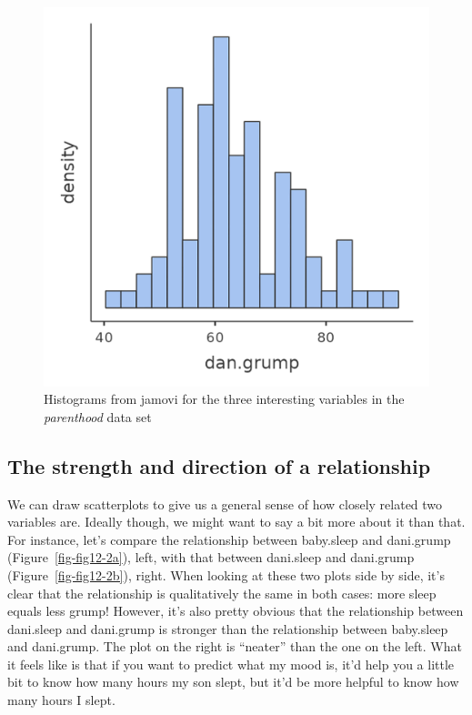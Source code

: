 \documentclass[
  a4paper,
]{book}
\begin{document}
\begin{figure}
\begin{minipage}[b]{0.33\linewidth}
{}

\subcaption{\label{fig-fig12-1b}}
\end{minipage}%
%
\begin{minipage}[b]{0.33\linewidth}

{\centering 

\includegraphics{images/fig12-1c.png}

}

\subcaption{\label{fig-fig12-1c}}
\end{minipage}%

\caption{\label{fig-fig12-1}Histograms from jamovi for the three
interesting variables in the \emph{parenthood} data set}

\end{figure}

\hypertarget{the-strength-and-direction-of-a-relationship}{%
\subsection{The strength and direction of a
relationship}\label{the-strength-and-direction-of-a-relationship}}

We can draw scatterplots to give us a general sense of how closely
related two variables are. Ideally though, we might want to say a bit
more about it than that. For instance, let's compare the relationship
between baby.sleep and dani.grump (Figure~\ref{fig-fig12-2a}), left,
with that between dani.sleep and dani.grump (Figure~\ref{fig-fig12-2b}),
right. When looking at these two plots side by side, it's clear that the
relationship is qualitatively the same in both cases: more sleep equals
less grump! However, it's also pretty obvious that the relationship
between dani.sleep and dani.grump is stronger than the relationship
between baby.sleep and dani.grump. The plot on the right is ``neater''
than the one on the left. What it feels like is that if you want to
predict what my mood is, it'd help you a little bit to know how many
hours my son slept, but it'd be more helpful to know how many hours I
slept.
\end{document}
